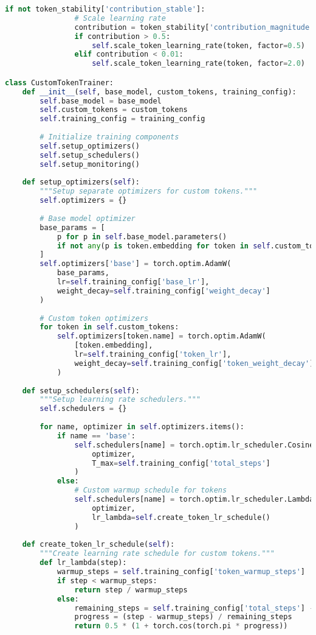\begin{lstlisting}[language=Python, caption=Progressive custom token integration]
            if not token_stability['contribution_stable']:
                # Scale learning rate
                contribution = token_stability['contribution_magnitude']
                if contribution > 0.5:
                    self.scale_token_learning_rate(token, factor=0.5)
                elif contribution < 0.01:
                    self.scale_token_learning_rate(token, factor=2.0)

class CustomTokenTrainer:
    def __init__(self, base_model, custom_tokens, training_config):
        self.base_model = base_model
        self.custom_tokens = custom_tokens
        self.training_config = training_config
        
        # Initialize training components
        self.setup_optimizers()
        self.setup_schedulers()
        self.setup_monitoring()
    
    def setup_optimizers(self):
        """Setup separate optimizers for custom tokens."""
        self.optimizers = {}
        
        # Base model optimizer
        base_params = [
            p for p in self.base_model.parameters() 
            if not any(p is token.embedding for token in self.custom_tokens)
        ]
        self.optimizers['base'] = torch.optim.AdamW(
            base_params, 
            lr=self.training_config['base_lr'],
            weight_decay=self.training_config['weight_decay']
        )
        
        # Custom token optimizers
        for token in self.custom_tokens:
            self.optimizers[token.name] = torch.optim.AdamW(
                [token.embedding],
                lr=self.training_config['token_lr'],
                weight_decay=self.training_config['token_weight_decay']
            )
    
    def setup_schedulers(self):
        """Setup learning rate schedulers."""
        self.schedulers = {}
        
        for name, optimizer in self.optimizers.items():
            if name == 'base':
                self.schedulers[name] = torch.optim.lr_scheduler.CosineAnnealingLR(
                    optimizer, 
                    T_max=self.training_config['total_steps']
                )
            else:
                # Custom warmup schedule for tokens
                self.schedulers[name] = torch.optim.lr_scheduler.LambdaLR(
                    optimizer,
                    lr_lambda=self.create_token_lr_schedule()
                )
    
    def create_token_lr_schedule(self):
        """Create learning rate schedule for custom tokens."""
        def lr_lambda(step):
            warmup_steps = self.training_config['token_warmup_steps']
            if step < warmup_steps:
                return step / warmup_steps
            else:
                remaining_steps = self.training_config['total_steps'] - warmup_steps
                progress = (step - warmup_steps) / remaining_steps
                return 0.5 * (1 + torch.cos(torch.pi * progress))
        

\end{lstlisting}
